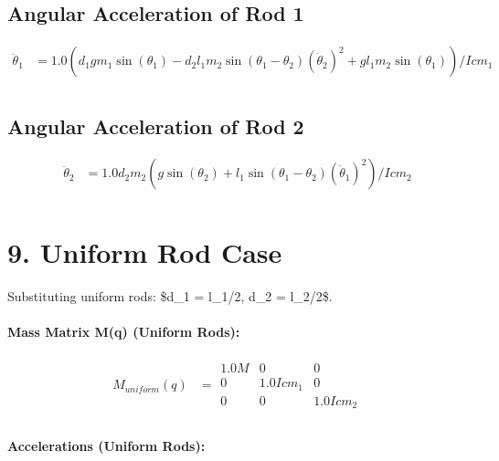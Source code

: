 \documentclass{article}%
\begin{document}
%
\subsection{Angular Acceleration of Rod 1}%
\label{subsec:AngularAccelerationofRod1}%
\begin{align*}%
\ddot{\theta}_1 &= \displaystyle 1.0 \left(d_{1} g m_{1} \sin(\theta_1 ) - d_{2} l_{1} m_{2} \sin(\theta_1 - \theta_2 ) \left(\dot{\theta}_{2}\right)^{2} + g l_{1} m_{2} \sin(\theta_1 )\right) / Icm_{1} \\%
\end{align*}

%
\subsection{Angular Acceleration of Rod 2}%
\label{subsec:AngularAccelerationofRod2}%
\begin{align*}%
\ddot{\theta}_2 &= \displaystyle 1.0 d_{2} m_{2} \left(g \sin(\theta_2 ) + l_{1} \sin(\theta_1 - \theta_2 ) \left(\dot{\theta}_{1}\right)^{2}\right) / Icm_{2} \\%
\end{align*}

%
\section{9. Uniform Rod Case}%
\label{sec:9.UniformRodCase}%
Substituting uniform rods: \$d\_1 = l\_1/2, d\_2 = l\_2/2\$.%
\paragraph{\textbf{Mass Matrix M(q) (Uniform Rods):}}%
\label{para:textbfMassMatrixM(q)(UniformRods)}%

%
\begin{align*}%
M_{uniform}(q) &= \displaystyle \begin{matrix}1.0 M & 0 & 0\\0 & 1.0 Icm_{1} & 0\\0 & 0 & 1.0 Icm_{2}\end{matrix} \\%
\end{align*}%
\paragraph{\textbf{Accelerations (Uniform Rods):}}%
\label{para:textbfAccelerations(UniformRods)}%
\end{document}
